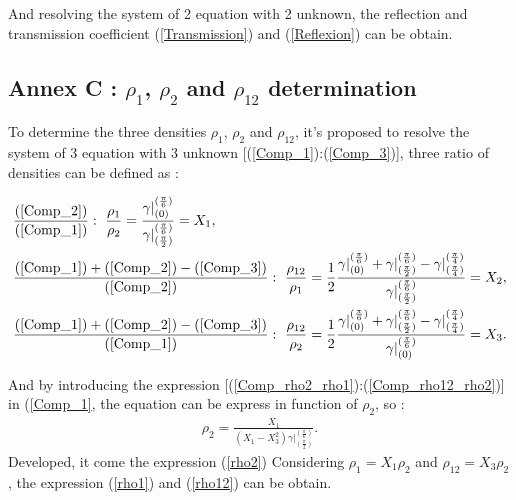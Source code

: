 \documentclass{article}
\begin{document}
    And resolving the system of 2 equation with 2 unknown, the reflection and transmission coefficient (\ref{Transmission}) and (\ref{Reflexion}) can be obtain.
    
\subsection*{Annex C : $\rho_1$, $\rho_2$ and $\rho_{12}$ determination}
\label{Ann_C}	
    To determine the three densities $\rho_1$, $\rho_2$ and $\rho_{12}$, it's proposed to resolve the system of 3 equation with 3 unknown  [(\ref{Comp_1}):(\ref{Comp_3})], three ratio of densities can be defined as : 
    
    \begin{align}
    &\frac{(\ref{Comp_2})}{(\ref{Comp_1})} :\ \frac{\rho_1}{\rho_2}=\frac{\gamma|^{(\frac{\pi}{6})}_{(0)}}{\gamma|^{(\frac{\pi}{6})}_{(\frac{\pi}{2})}}=X_1,\label{Comp_rho2_rho1} \\
    &\frac{(\ref{Comp_1})+(\ref{Comp_2})-(\ref{Comp_3})}{(\ref{Comp_2})} :\ \frac{\rho_{12}}{\rho_1}=\frac{1}{2}\frac{\gamma|^{(\frac{\pi}{6})}_{(0)}+\gamma|^{(\frac{\pi}{6})}_{(\frac{\pi}{2})}-\gamma|^{(\frac{\pi}{4})}_{(\frac{\pi}{4})}}{\gamma|^{(\frac{\pi}{6})}_{(\frac{\pi}{2})}}=X_2,\label{Comp_rho12_rho1} \\
    &\frac{(\ref{Comp_1})+(\ref{Comp_2})-(\ref{Comp_3})}{(\ref{Comp_1})} :\ \frac{\rho_{12}}{\rho_2}=\frac{1}{2}\frac{\gamma|^{(\frac{\pi}{6})}_{(0)}+\gamma|^{(\frac{\pi}{6})}_{(\frac{\pi}{2})}-\gamma|^{(\frac{\pi}{4})}_{(\frac{\pi}{4})}}{\gamma|^{(\frac{\pi}{6})}_{(0)}}=X_3.\label{Comp_rho12_rho2}
    \end{align}
    
    And by introducing the expression [(\ref{Comp_rho2_rho1}):(\ref{Comp_rho12_rho2})] in (\ref{Comp_1}, the equation can be express in function of $\rho_2$, so :
    \begin{align}
    \rho_2=\frac{X_1}{(X_1-X_3^2)\gamma|^{(\frac{\pi}{6})}_{(\frac{\pi}{2})}}.\label{comp_rho2}
    \end{align}
    Developed, it come the expression (\ref{rho2})
    Considering $\rho_1=X_1\rho_2$ and $\rho_{12}=X_3\rho_2$, the expression (\ref{rho1}) and (\ref{rho12}) can be obtain.
    
\end{document}

